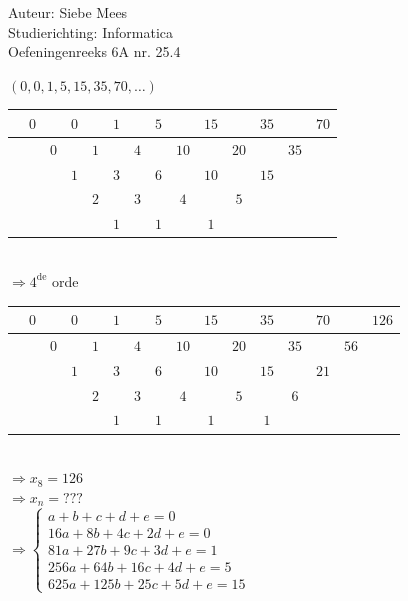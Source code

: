 \documentclass[a4paper]{article}
\begin{document}
  
\noindent \large Auteur: Siebe Mees \\
\noindent \large Studierichting: Informatica\\
\noindent \large Oefeningenreeks 6A nr. 25.4\\

\medskip

\normalsize

$(0, 0, 1, 5, 15, 35, 70, \ldots)$\\

\begin{tabular}{c|ccccccccccccc}
 & $0$ &  & $0$ &  & $1$ &  & $5$ &  & $15$ &  & $35$ &  & $70$ \\ \hline
 &  & $0$ &  & $1$ &  & $4$ &  & $10$ &  & $20$ &  & $35$ &  \\
 &  &  & $1$ &  & $3$ &  & $6$ &  & $10$ &  & $15$ &  &  \\
 &  &  &  & $2$ &  & $3$ &  & $4$ &  & $5$ &  &  &  \\
 &  &  &  &  & $1$ &  & $1$ &  & $1$ &  &  &  &  \\
\end{tabular}\\

$\Rightarrow  4^{\text{de}}$ orde\\

\begin{tabular}{c|ccccccccccccccc}
 & $0$ &  & $0$ &  & $1$ &  & $5$ &  & $15$ &  & $35$ &  & $70$ &  & $126$ \\ \hline
 &  & $0$ &  & $1$ &  & $4$ &  & $10$ &  & $20$ &  & $35$ &  & $56$ &  \\
 &  &  & $1$ &  & $3$ &  & $6$ &  & $10$ &  & $15$ &  & $21$ &  &  \\
 &  &  &  & $2$ &  & $3$ &  & $4$ &  & $5$ &  & $6$ &  &  &  \\
 &  &  &  &  & $1$ &  & $1$ &  & $1$ &  & $1$ &  &  &  &  \\
\end{tabular}\\

$\Rightarrow  x_8 = 126$\\

$\Rightarrow  x_n = ???$\\

$ \Rightarrow \left \{
\begin{array}{l}
a + b + c + d + e = 0\\

16a + 8b + 4c + 2d + e = 0\\

81a + 27b + 9c + 3d + e = 1\\

256a + 64b + 16c + 4d + e = 5\\

625a + 125b + 25c + 5d + e = 15
\end{array}
\right .$\\
\end{document}
